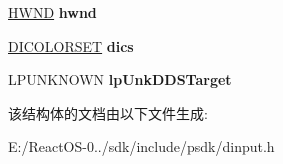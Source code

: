\begin{DoxyCompactItemize}
\hyperlink{interfacevoid}{H\+W\+ND} {\bfseries hwnd}
\item 
\mbox{\label{struct___d_i_c_o_n_f_i_g_u_r_e_d_e_v_i_c_e_s_p_a_r_a_m_s_a_a81e7c19878f46061a4f285c46e69297d}} 
\hyperlink{struct___d_i_c_o_l_o_r_s_e_t}{D\+I\+C\+O\+L\+O\+R\+S\+ET} {\bfseries dics}
\item 
\mbox{\label{struct___d_i_c_o_n_f_i_g_u_r_e_d_e_v_i_c_e_s_p_a_r_a_m_s_a_ae4600119eb773b02f8eb12ae25082006}} 
L\+P\+U\+N\+K\+N\+O\+WN {\bfseries lp\+Unk\+D\+D\+S\+Target}
\end{DoxyCompactItemize}


该结构体的文档由以下文件生成\+:\begin{DoxyCompactItemize}
\item 
E\+:/\+React\+O\+S-\/0../sdk/include/psdk/dinput.\+h\end{DoxyCompactItemize}
